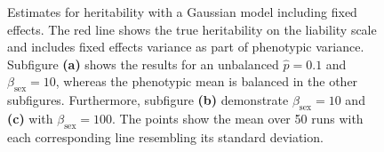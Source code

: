 \begin{figure}
\begin{subfigure}{0.49\textwidth}
    \end{subfigure}
    \caption[Estimated $h^2_\text{liab}$ compared to true value for fixed effects models]{Estimates for heritability with a Gaussian model including fixed effects. The red line shows the true heritability on the liability scale and includes fixed effects variance as part of phenotypic variance. Subfigure \textbf{(a)} shows the results for an unbalanced $\hat p=0.1$ and $\beta_\text{sex}=10$, whereas the phenotypic mean is balanced in the other subfigures. Furthermore, subfigure \textbf{(b)} demonstrate $\beta_\text{sex}=10$ and \textbf{(c)} with $\beta_\text{sex}=100$. The points show the mean over 50 runs with each corresponding line resembling its standard deviation.}
    \label{fig:fixed effects sim deviance gaussian model}
\end{figure}

